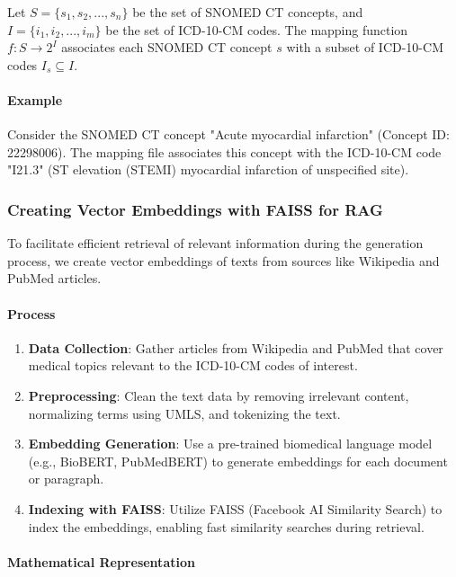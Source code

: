 \documentclass[12pt, a4paper]{article}
\begin{document}
Let \( S = \{s_1, s_2, ..., s_n\} \) be the set of SNOMED CT concepts, and \( I = \{i_1, i_2, ..., i_m\} \) be the set of ICD-10-CM codes. The mapping function \( f: S \rightarrow 2^I \) associates each SNOMED CT concept \( s \) with a subset of ICD-10-CM codes \( I_s \subseteq I \).

\paragraph{Example}

Consider the SNOMED CT concept "Acute myocardial infarction" (Concept ID: 22298006). The mapping file associates this concept with the ICD-10-CM code "I21.3" (ST elevation (STEMI) myocardial infarction of unspecified site).

\subsubsection{Creating Vector Embeddings with FAISS for RAG}

To facilitate efficient retrieval of relevant information during the generation process, we create vector embeddings of texts from sources like Wikipedia and PubMed articles.

\paragraph{Process}

\begin{enumerate}
    \item \textbf{Data Collection}: Gather articles from Wikipedia and PubMed that cover medical topics relevant to the ICD-10-CM codes of interest.
    \item \textbf{Preprocessing}: Clean the text data by removing irrelevant content, normalizing terms using UMLS, and tokenizing the text.
    \item \textbf{Embedding Generation}: Use a pre-trained biomedical language model (e.g., BioBERT, PubMedBERT) to generate embeddings for each document or paragraph.
    \item \textbf{Indexing with FAISS}: Utilize FAISS (Facebook AI Similarity Search) to index the embeddings, enabling fast similarity searches during retrieval.
\end{enumerate}

\paragraph{Mathematical Representation}
\end{document}
